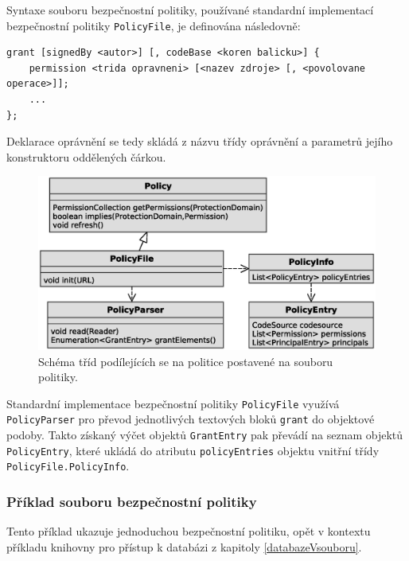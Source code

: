 Syntaxe souboru bezpečnostní politiky, používané standardní implementací bezpečnostní politiky {\tt PolicyFile}, je definována následovně: \cite[5.3.1]{oaks}

\begin{lstlisting}[caption=Syntaxe souboru bezpečnostní politiky, label=syntaxeSouboruBP]
grant [signedBy <autor>] [, codeBase <koren balicku>] {
    permission <trida opravneni> [<nazev zdroje> [, <povolovane operace>]];
    ...
};
\end{lstlisting}

Deklarace oprávnění se tedy skládá z názvu třídy oprávnění a parametrů jejího konstruktoru oddělených čárkou.

\begin{figure}[ht]
  \centering
  \includegraphics[width=14cm]{fig/policy-schema}
  \caption{Schéma tříd podílejících se na politice postavené na souboru politiky.}
\end{figure}

Standardní implementace bezpečnostní politiky {\tt PolicyFile} využívá {\tt PolicyParser} pro převod jednotlivých textových bloků {\tt grant} do objektové podoby.
Takto získaný výčet objektů {\tt GrantEntry} pak převádí na seznam objektů {\tt PolicyEntry}, které ukládá do atributu {\tt policyEntries} objektu vnitřní třídy {\tt PolicyFile.PolicyInfo}.

\subsubsection{Příklad souboru bezpečnostní politiky}

Tento příklad ukazuje jednoduchou bezpečnostní politiku, opět v kontextu příkladu knihovny pro přístup k databázi z kapitoly \ref{databazeVsouboru}.


